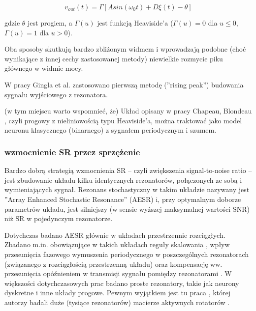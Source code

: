   \begin{equation} \label{sr:gingl2}
    v_{out}(t) = \Gamma[A sin (\omega_0 t) + D \xi(t) - \theta]
  \end{equation}

  gdzie $\theta$ jest progiem, a $\Gamma(u)$ jest funkcją Heaviside'a ($\Gamma(u) = 0$ dla $u \leq 0$, $\Gamma(u) = 1$ dla $u > 0$).

  Oba sposoby skutkują bardzo zbliżonym widmem i wprowadzają podobne (choć wynikające z innej cechy zastosowanej metody) niewielkie rozmycie piku głównego w widmie mocy.

  W pracy Gingla et al. zastosowano pierwszą metodę (''rising peak'') budowania sygnału wyjściowego z rezonatora.

  (w tym miejscu warto wspomnieć, że) Układ opisany w pracy Chapeau, Blondeau \cite{blondeau_e53}, czyli progowy z nieliniowością typu Heaviside'a, można traktować jako model neuronu klasycznego (binarnego) z sygnałem periodycznym i szumem.

  \subsubsection{wzmocnienie SR przez sprzężenie}

  Bardzo dobrą strategią wzmocnienia SR -- czyli zwiększenia signal-to-noise ratio -- jest zbudowanie układu kilku identycznych rezonatorów, połączonych ze sobą i wymieniających sygnał. Rezonans stochastyczny w takim układzie nazywany jest ''Array Enhanced Stochastic Resonance'' (AESR) \cite{lindner_meadows} i, przy optymalnym doborze parametrów układu, jest silniejszy (w sensie wyższej maksymalnej wartości SNR) niż SR w pojedynczym rezonatorze.


  Dotychczas badano AESR głównie w układach przestrzennie rozciągłych. Zbadano m.in. obowiązujące w takich układach reguły skalowania \cite{lindner_meadows} \cite{tanabe_shimokawa}, wpływ przesunięcia fazowego wymuszenia periodycznego w poszczególnych rezonatorach (związanego z rozciągłością przestrzenną układu) \cite{ijmpb_14_8} oraz kompensację ww. przesunięcia opóźnieniem w transmisji sygnału pomiędzy rezonatorami \cite{ijmpb_23_2}. W większości dotychczasowych prac badano proste rezonatory, takie jak neurony dyskretne i inne układy progowe. Pewnym wyjątkiem jest tu praca \cite{tanabe_shimokawa}, której autorzy badali duże (tysiące rezonatorów) macierze aktywnych rotatorów \cite{wiesenfeld} \cite{pakdaman}.

